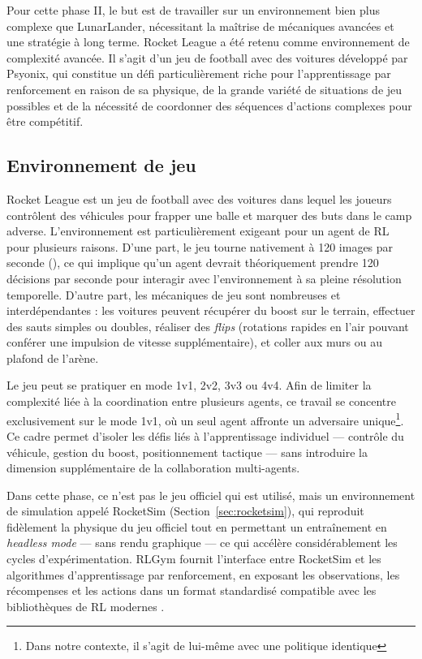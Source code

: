 Pour cette phase II, le but est de travailler sur un environnement bien plus complexe que LunarLander, nécessitant la maîtrise de mécaniques avancées et une stratégie à long terme. Rocket League a été retenu comme environnement de complexité avancée. Il s'agit d'un jeu de football avec des voitures développé par Psyonix, qui constitue un défi particulièrement riche pour l'apprentissage par renforcement en raison de sa physique, de la grande variété de situations de jeu possibles et de la nécessité de coordonner des séquences d'actions complexes pour être compétitif.

\subsection{Environnement de jeu}
Rocket League est un jeu de football avec des voitures dans lequel les joueurs contrôlent des véhicules pour frapper une balle et marquer des buts dans le camp adverse. L'environnement est particulièrement exigeant pour un agent de RL pour plusieurs raisons. D'une part, le jeu tourne nativement à 120 images par seconde (\cite{ListGameValues}), ce qui implique qu'un agent devrait théoriquement prendre 120 décisions par seconde pour interagir avec l'environnement à sa pleine résolution temporelle. D'autre part, les mécaniques de jeu sont nombreuses et interdépendantes : les voitures peuvent récupérer du boost sur le terrain, effectuer des sauts simples ou doubles, réaliser des \textit{flips} (rotations rapides en l'air pouvant conférer une impulsion de vitesse supplémentaire), et coller aux murs ou au plafond de l'arène.

Le jeu peut se pratiquer en mode 1v1, 2v2, 3v3 ou 4v4. Afin de limiter la complexité liée à la coordination entre plusieurs agents, ce travail se concentre exclusivement sur le mode 1v1, où un seul agent affronte un adversaire unique\footnote{Dans notre contexte, il s'agit de lui-même avec une politique identique}. Ce cadre permet d'isoler les défis liés à l'apprentissage individuel — contrôle du véhicule, gestion du boost, positionnement tactique — sans introduire la dimension supplémentaire de la collaboration multi-agents.

Dans cette phase, ce n'est pas le jeu officiel qui est utilisé, mais un environnement de simulation appelé RocketSim (Section~\ref{sec:rocketsim}), qui reproduit fidèlement la physique du jeu officiel tout en permettant un entraînement en \textit{headless mode} — sans rendu graphique — ce qui accélère considérablement les cycles d'expérimentation. RLGym fournit l'interface entre RocketSim et les algorithmes d'apprentissage par renforcement, en exposant les observations, les récompenses et les actions dans un format standardisé compatible avec les bibliothèques de RL modernes \parencite{RLGymRlgym2026}.


